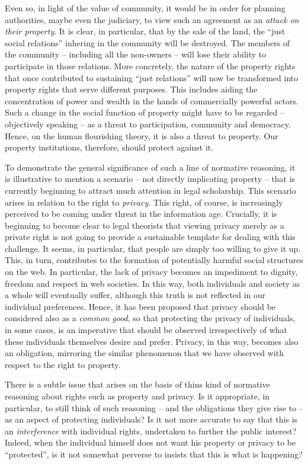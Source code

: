 Even so, in light of the value of community, it would be in order for planning authorities, maybe even the judiciary, to view such an  agreement as an {\it attack on their property}. It is clear, in particular, that by the sale of the land, the ``just social relations'' inhering in the community will be destroyed. The members of the community -- including all the non-owners -- will lose their ability to participate in those relations. More concretely, the nature of the property rights that once contributed to sustaining ``just relations'' will now be transformed into property rights that serve different purposes. This includes aiding the concentration of power and wealth in the hands of commercially powerful actors. Such a change in the social function of property might have to be regarded -- objectively speaking -- as a threat to participation, community and democracy. Hence, on the human flourishing theory, it is also a threat to property. Our property institutions, therefore, should protect against it.

To demonstrate the general significance of such a line of normative reasoning, it is illustrative to mention a scenario -- not directly implicating property -- that is currently beginning to attract much attention in legal scholarship. This scenario arises in relation to the right to {\it privacy}. This right, of course, is increasingly perceived to be coming under threat in the information age. Crucially, it is beginning to become clear to legal theorists that viewing privacy merely as a private right is not going to provide a sustainable template for dealing with this challenge. It seems, in particular, that people are simply too willing to give it up. This, in turn, contributes to the formation of potentially harmful social structures on the web. In particular, the lack of privacy becomes an impediment to dignity, freedom and respect in web societies. In this way, both individuals and society as a whole will eventually suffer, although this truth is not reflected in our individual preferences. Hence, it has been proposed that privacy should be considered also as a {\it common good}, so that protecting the privacy of individuals, in some cases, is an imperative that should be observed irrespectively of what these individuals themselves desire and prefer. Privacy, in this way, becomes also an obligation, mirroring the similar phenomenon that we have observed with respect to the right to property.

There is a subtle issue that arises on the basis of thins kind of normative reasoning about rights such as property and privacy. Is it appropriate, in particular, to still think of such reasoning -- and the obligations they give rise to -- as an aspect of protecting individuals? Is it not more accurate to say that this is an {\it interference} with individual rights, undertaken to further the public interest? Indeed, when the individual himself does not want his property or privacy to be ``protected'', is it not somewhat perverse to insists that this is what is happening? 

